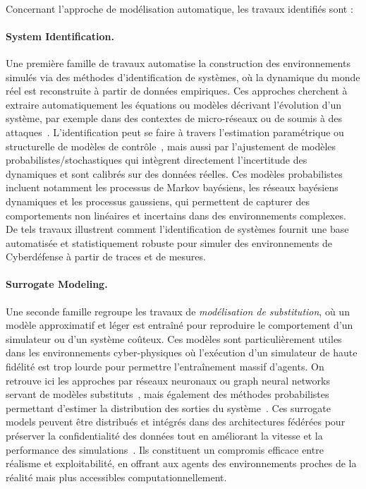 \

Concernant l'approche de modélisation automatique, les travaux identifiés sont :

\paragraph{System Identification.}
Une première famille de travaux automatise la construction des environnements simulés via des méthodes d'identification de systèmes, où la dynamique du monde réel est reconstruite à partir de données empiriques. Ces approches cherchent à extraire automatiquement les équations ou modèles décrivant l'évolution d'un système, par exemple dans des contextes de micro-réseaux ou de  soumis à des attaques~\cite{NtDvjag65BgJ, tBI-_piWs1cJ}. L'identification peut se faire à travers l'estimation paramétrique ou structurelle de modèles de contrôle~\cite{g5PxHs45ZtYJ}, mais aussi par l'ajustement de modèles probabilistes/stochastiques qui intègrent directement l'incertitude des dynamiques et sont calibrés sur des données réelles. Ces modèles probabilistes incluent notamment les processus de Markov bayésiens, les réseaux bayésiens dynamiques et les processus gaussiens, qui permettent de capturer des comportements non linéaires et incertains dans des environnements complexes. De tels travaux illustrent comment l'identification de systèmes fournit une base automatisée et statistiquement robuste pour simuler des environnements de Cyberdéfense à partir de traces et de mesures.

\paragraph{Surrogate Modeling.}
Une seconde famille regroupe les travaux de \textit{modélisation de substitution}, où un modèle approximatif et léger est entraîné pour reproduire le comportement d'un simulateur ou d'un système coûteux. Ces modèles sont particulièrement utiles dans les environnements cyber-physiques où l'exécution d'un simulateur de haute fidélité est trop lourde pour permettre l'entraînement massif d'agents. On retrouve ici les approches par réseaux neuronaux ou graph neural networks servant de modèles substituts~\cite{g4qXIBHVJwUJ, Cr1JpifjcFwJ}, mais également des méthodes probabilistes permettant d'estimer la distribution des sorties du système~\cite{hPBZHSLGStkJ}. Ces surrogate models peuvent être distribués et intégrés dans des architectures fédérées pour préserver la confidentialité des données tout en améliorant la vitesse et la performance des simulations~\cite{g4qXIBHVJwUJ}. Ils constituent un compromis efficace entre réalisme et exploitabilité, en offrant aux agents des environnements proches de la réalité mais plus accessibles computationnellement.


